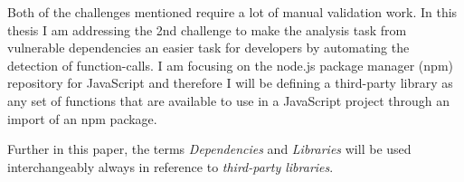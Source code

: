 
Both of the challenges mentioned require a lot of manual validation work. In this thesis I am addressing the 2nd challenge to make the analysis task from vulnerable dependencies an easier task for developers by automating the detection of function-calls. I am focusing on the node.js package manager (npm) repository for JavaScript and therefore I will be defining a third-party library as any set of functions that are available to use in a JavaScript project through an import of an npm package.  
 
Further in this paper, the terms \textit{Dependencies} and \textit{Libraries} will be used interchangeably always in reference to \textit{third-party libraries}.